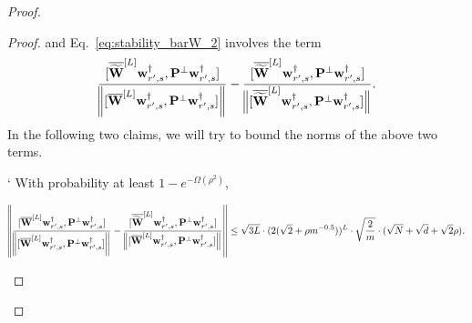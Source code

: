 \begin{claim}
\begin{proof}
\begin{proof}
					and  Eq.~\ref{eq:stability_barW_2} involves the term
					\begin{equation*}
						\frac{[\overline{\widetilde{\mathbf{W}}}^{[L]} \mathbf{w}_{r', s}^{\dagger}, \mathbf{P}^{\perp}\mathbf{w}_{r', s}^{\dagger}]}{\norm{[\overline{\mathbf{W}}^{[L]} \mathbf{w}_{r', s}^{\dagger}, \mathbf{P}^{\perp}\mathbf{w}_{r', s}^{\dagger}]}} - \frac{[\overline{\widetilde{\mathbf{W}}}^{[L]} \mathbf{w}_{r', s}^{\dagger}, \mathbf{P}^{\perp}\mathbf{w}_{r', s}^{\dagger}]}{\norm[2]{[\overline{\widetilde{\mathbf{W}}}^{[L]} \mathbf{w}_{r', s}^{\dagger}, \mathbf{P}^{\perp}\mathbf{w}_{r', s}^{\dagger}]}}.
					\end{equation*}
					In the following two claims, we will try to bound the norms of the above two terms.
					
					\begin{claim}\label{claim:stability_barW_1}
						`                   With probability at least $1-e^{-\Omega(\rho^2)}$,
						
						\begin{equation*}
							\norm{\frac{[\overline{\mathbf{W}}^{[L]} \mathbf{w}_{r', s}^{\dagger}, \mathbf{P}^{\perp}\mathbf{w}_{r', s}^{\dagger}]}{\norm{[\overline{\mathbf{W}}^{[L]} \mathbf{w}_{r', s}^{\dagger}, \mathbf{P}^{\perp}\mathbf{w}_{r', s}^{\dagger}]}} - \frac{[\overline{\widetilde{\mathbf{W}}}^{[L]} \mathbf{w}_{r', s}^{\dagger}, \mathbf{P}^{\perp}\mathbf{w}_{r', s}^{\dagger}]}{\norm[2]{[\overline{\mathbf{W}}^{[L]} \mathbf{w}_{r', s}^{\dagger}, \mathbf{P}^{\perp}\mathbf{w}_{r', s}^{\dagger}]}}} \le \sqrt{3L} \cdot (2 (\sqrt{2} + \rho m^{-0.5}))^{L} \cdot \sqrt{\frac{2}{m}} \cdot   (\sqrt{N} + \sqrt{d} + \sqrt{2}\rho).
						\end{equation*}
					\end{claim}
					

\end{proof}
\end{proof}
\end{claim}
